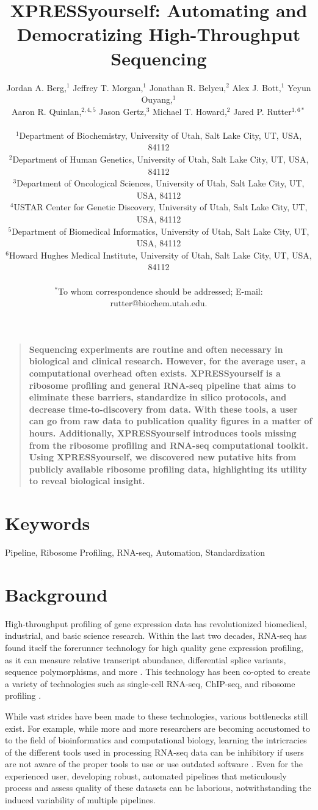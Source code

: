 \documentclass[11pt, a4paper, oneside]{article}
\title{
XPRESSyourself: Automating and Democratizing High-Throughput Sequencing
}
\author{
Jordan A. Berg,$^{1}$ Jeffrey T. Morgan,$^{1}$ Jonathan R. Belyeu,$^{2}$ Alex J. Bott,$^{1}$ Yeyun Ouyang,$^{1}$\\
Aaron R. Quinlan,$^{2,4,5}$ Jason Gertz,$^{3}$ Michael T. Howard,$^{2}$ Jared P. Rutter$^{1,6\ast}$\\
\\
\normalsize{$^{1}$Department of Biochemistry, University of Utah, Salt Lake City, UT, USA, 84112}\\
\normalsize{$^{2}$Department of Human Genetics, University of Utah, Salt Lake City, UT, USA, 84112}\\
\normalsize{$^{3}$Department of Oncological Sciences, University of Utah, Salt Lake City, UT, USA, 84112}\\
\normalsize{$^{4}$USTAR Center for Genetic Discovery, University of Utah, Salt Lake City, UT, USA, 84112}\\
\normalsize{$^{5}$Department of Biomedical Informatics, University of Utah, Salt Lake City, UT, USA, 84112}\\
\normalsize{$^{6}$Howard Hughes Medical Institute, University of Utah, Salt Lake City, UT, USA, 84112}\\
\\
\normalsize{$^\ast$To whom correspondence should be addressed; E-mail: rutter@biochem.utah.edu.}
}
\date{}
\newenvironment{sciabstract}{%
\begin{quote} \bf}
{\end{quote}}
\begin{document}
\baselineskip24pt

\maketitle



\begin{sciabstract}
Sequencing experiments are routine and often necessary in biological and clinical research. However, for the average user, a computational overhead often exists. XPRESSyourself is a ribosome profiling and general RNA-seq pipeline that aims to eliminate these barriers, standardize in silico protocols, and decrease time-to-discovery from data. With these tools, a user can go from raw data to publication quality figures in a matter of hours. Additionally, XPRESSyourself introduces tools missing from the ribosome profiling and RNA-seq computational toolkit. Using XPRESSyourself, we discovered new putative hits from publicly available ribosome profiling data, highlighting its utility to reveal biological insight.
\end{sciabstract}

\section*{Keywords}
Pipeline, Ribosome Profiling, RNA-seq, Automation, Standardization

\section{Background}
High-throughput profiling of gene expression data has revolutionized biomedical, industrial, and basic science research. Within the last two decades, RNA-seq has found itself the forerunner technology for high quality gene expression profiling, as it can measure relative transcript abundance, differential splice variants, sequence polymorphisms, and more \cite{byron_nrg}. This technology has been co-opted to create a variety of technologies such as single-cell RNA-seq, ChIP-seq, and ribosome profiling \cite{ingolia_science}.

While vast strides have been made to these technologies, various bottlenecks still exist. For example, while more and more researchers are becoming accustomed to to the field of bioinformatics and computational biology, learning the intricracies of the different tools used in processing RNA-seq data can be inhibitory if users are not aware of the proper tools to use or use outdated software \cite{costello_npjsba, funari_science}. Even for the experienced user, developing robust, automated pipelines that meticulously process and assess quality of these datasets can be laborious, notwithstanding the induced variability of multiple pipelines.
\end{document}
